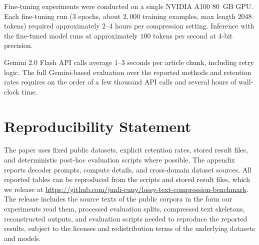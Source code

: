 \documentclass[11pt]{article}
\begin{document}
Fine-tuning experiments were conducted on a single NVIDIA
A100 80~GB GPU.  Each fine-tuning run (3 epochs, about $2{,}000$ training examples, max length 2048 tokens) required
approximately $2$--$4$ hours per compression setting.
Inference with the fine-tuned model runs at approximately
$100$ tokens per second at 4-bit precision.

Gemini 2.0 Flash API calls average $1$--$3$ seconds per
article chunk, including retry logic.  The full Gemini-based
evaluation over the reported methods and retention rates
requires on the order of a few thousand API calls and
several hours of wall-clock time.

\section{Reproducibility Statement}

\label{app:reproducibility}

The paper uses fixed public datasets, explicit retention rates, stored result files, and deterministic post-hoc evaluation scripts where possible. The appendix
reports decoder prompts, compute details, and cross-domain dataset sources. All reported tables can be reproduced from the scripts and stored result files, which we release at \url{https://github.com/junli-cuny/lossy-text-compression-benchmark}.
The release includes the source texts of the public corpora in the form our experiments read them, processed evaluation splits, compressed text
skeletons, reconstructed outputs, and evaluation scripts needed to reproduce the reported
results, subject to the licenses and redistribution terms of the underlying datasets and
models.
\end{document}
